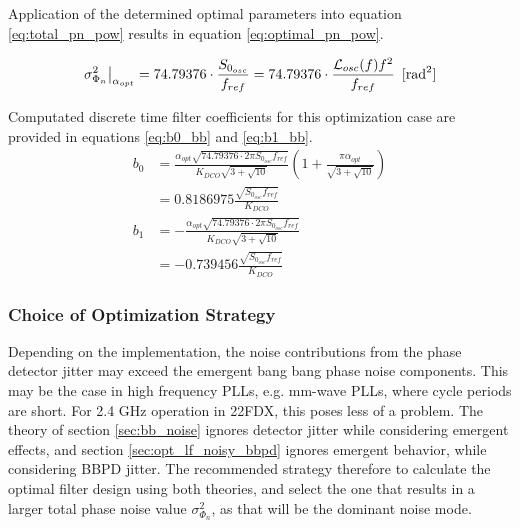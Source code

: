 Application of the determined optimal parameters into equation \ref{eq:total_pn_pow} results in equation \ref{eq:optimal_pn_pow}. 

	\begin{equation}\label{eq:optimal_pn_pow}
		\left.\sigma_{\Phi_{n}}^2\right|_{\alpha_{opt}} = 74.79376\cdot\frac{S_{0_{osc}}}{f_{ref}} = 74.79376\cdot \frac{\mathcal{L}_{osc}(f)f^2}{f_{ref}} \hspace{0.5em} [\textnormal{rad}^2]
	\end{equation}





	Computated discrete time filter coefficients for this optimization case are provided in equations \ref{eq:b0_bb} and \ref{eq:b1_bb}.
	\begin{align}
		b_0 &= \frac{\alpha_{opt}\sqrt{74.79376\cdot2\pi S_{0_{osc}} f_{ref}}}{K_{DCO}\sqrt{3+\sqrt{10}}}\left(1+\frac{\pi\alpha_{opt}}{\sqrt{3+\sqrt{10}}}\right)\label{eq:b0_bb}\\
		&= 0.8186975 \frac{\sqrt{S_{0_{osc}} f_{ref}}}{K_{DCO}}\\
		b_1 &= -\frac{\alpha_{opt}\sqrt{74.79376\cdot2\pi S_{0_{osc}} f_{ref}}}{K_{DCO}\sqrt{3+\sqrt{10}}} \label{eq:b1_bb}\\
		&=-0.739456 \frac{\sqrt{S_{0_{osc}} f_{ref}}}{K_{DCO}}
	\end{align}

	\subsubsection{Choice of Optimization Strategy}
	Depending on the implementation, the noise contributions from the phase detector jitter may exceed the emergent bang bang phase noise components. This may be the case in high frequency PLLs, e.g. mm-wave PLLs, where cycle periods are short. For 2.4 GHz operation in 22FDX, this poses less of a problem. The theory of section \ref{sec:bb_noise} ignores detector jitter while considering emergent effects, and section \ref{sec:opt_lf_noisy_bbpd} ignores emergent behavior, while considering BBPD jitter. The recommended strategy therefore to calculate the optimal filter design using both theories, and select the one that results in a larger total phase noise value $\sigma_{\Phi_{n}}^2$, as that will be the dominant noise mode. 

